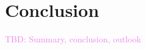 \chapter{Conclusion}\label{conclusion}
\textcolor{violet}{
TBD: Summary, conclusion, outlook
}







